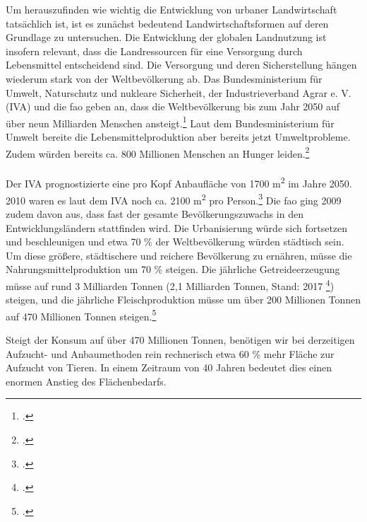 \documentclass{scrartcl}
\begin{document}
Um herauszufinden wie wichtig die Entwicklung von urbaner Landwirtschaft tatsächlich ist, ist es zunächst bedeutend Landwirtschaftsformen auf deren Grundlage zu untersuchen. Die Entwicklung der globalen Landnutzung ist insofern relevant, dass die Landressourcen für eine Versorgung durch Lebensmittel entscheidend sind. Die Versorgung und deren Sicherstellung hängen wiederum stark von der Weltbevölkerung ab. Das Bundesministerium für Umwelt, Naturschutz und nukleare Sicherheit, der Industrieverband Agrar e. V. (IVA) und die \acs{fao} geben an, dass die Weltbevölkerung bis zum Jahr 2050 auf über neun Milliarden Menschen ansteigt.\footcites[Vgl.]{BMU2016GlobaleUmweltfolgen}[sowie]{Agrar0NahrungsmittelLandwirtschaft}{FAO2009How2050} Laut dem Bundesministerium für Umwelt bereite die Lebensmittelproduktion aber bereits jetzt Umweltprobleme. Zudem würden bereits ca. 800 Millionen Menschen an Hunger leiden.\footcite[Vgl.]{BMU2016GlobaleUmweltfolgen} \\
\\
Der IVA prognostizierte eine pro Kopf Anbaufläche von 1700 m\textsuperscript{2} im Jahre 2050. 2010 waren es laut dem IVA noch ca. 2100 m\textsuperscript{2} pro Person.\footcite[Vgl.]{Agrar0NahrungsmittelLandwirtschaft} Die \acs{fao} ging 2009 zudem davon aus, dass fast der gesamte Bevölkerungszuwachs in den Entwicklungsländern stattfinden wird. Die Urbanisierung würde sich fortsetzen und beschleunigen und etwa 70 \% der Weltbevölkerung würden städtisch sein. Um diese größere, städtischere und reichere Bevölkerung zu ernähren, müsse die Nahrungsmittelproduktion um 70 \% steigen. Die jährliche Getreideerzeugung müsse auf rund 3 Milliarden Tonnen (2,1 Milliarden Tonnen, Stand: 2017 \footcite[Vgl.]{IGCInternationalGrainsCouncil2018IGCIndex}) steigen, und die jährliche Fleischproduktion müsse um über 200 Millionen Tonnen auf 470 Millionen Tonnen steigen.\footcite[Vgl.][S. 2]{FAO2009How2050}


Steigt der Konsum auf über 470 Millionen Tonnen, benötigen wir bei derzeitigen Aufzucht- und Anbaumethoden rein rechnerisch etwa 60 \% mehr Fläche zur Aufzucht von Tieren. In einem Zeitraum von 40 Jahren bedeutet dies einen enormen Anstieg des Flächenbedarfs.
\end{document}
